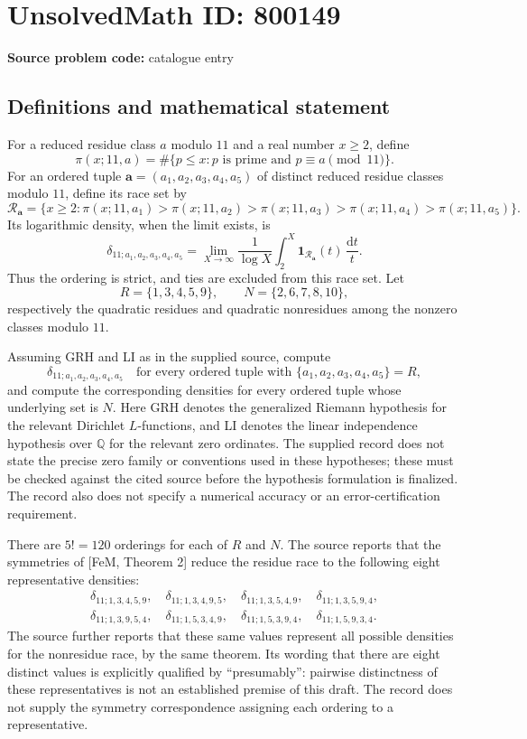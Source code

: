 \documentclass[11pt]{article}
\newcommand{\Q}{\mathbb{Q}}
\begin{document}
\section*{UnsolvedMath ID: 800149}
\textbf{Source problem code:} catalogue entry
\subsection{Definitions and mathematical statement}
For a reduced residue class \(a\) modulo \(11\) and a real number \(x\geq 2\), define
\[
\pi(x;11,a)=\#\{p\leq x:p\text{ is prime and }p\equiv a\pmod{11}\}.
\]
For an ordered tuple \(\boldsymbol a=(a_1,a_2,a_3,a_4,a_5)\) of distinct reduced residue classes modulo \(11\), define its race set by
\[
\mathcal R_{\boldsymbol a}=\{x\geq2:\pi(x;11,a_1)>\pi(x;11,a_2)>\pi(x;11,a_3)>\pi(x;11,a_4)>\pi(x;11,a_5)\}.
\]
Its logarithmic density, when the limit exists, is
\[
\delta_{11;a_1,a_2,a_3,a_4,a_5}
=\lim_{X\to\infty}\frac{1}{\log X}
\int_2^X\mathbf 1_{\mathcal R_{\boldsymbol a}}(t)\,\frac{\mathrm dt}{t}.
\]
Thus the ordering is strict, and ties are excluded from this race set. Let
\[
R=\{1,3,4,5,9\},\qquad N=\{2,6,7,8,10\},
\]
respectively the quadratic residues and quadratic nonresidues among the nonzero classes modulo \(11\).

Assuming GRH and LI as in the supplied source, compute
\[
\delta_{11;a_1,a_2,a_3,a_4,a_5}
\quad\text{for every ordered tuple with }\{a_1,a_2,a_3,a_4,a_5\}=R,
\]
and compute the corresponding densities for every ordered tuple whose underlying set is \(N\). Here GRH denotes the generalized Riemann hypothesis for the relevant Dirichlet \(L\)-functions, and LI denotes the linear independence hypothesis over \(\Q\) for the relevant zero ordinates. The supplied record does not state the precise zero family or conventions used in these hypotheses; these must be checked against the cited source before the hypothesis formulation is finalized. The record also does not specify a numerical accuracy or an error-certification requirement.

There are \(5!=120\) orderings for each of \(R\) and \(N\). The source reports that the symmetries of [FeM, Theorem 2] reduce the residue race to the following eight representative densities:
\[
\begin{gathered}
\delta_{11;1,3,4,5,9},\quad
\delta_{11;1,3,4,9,5},\quad
\delta_{11;1,3,5,4,9},\quad
\delta_{11;1,3,5,9,4},\\
\delta_{11;1,3,9,5,4},\quad
\delta_{11;1,5,3,4,9},\quad
\delta_{11;1,5,3,9,4},\quad
\delta_{11;1,5,9,3,4}.
\end{gathered}
\]
The source further reports that these same values represent all possible densities for the nonresidue race, by the same theorem. Its wording that there are eight distinct values is explicitly qualified by ``presumably'': pairwise distinctness of these representatives is not an established premise of this draft. The record does not supply the symmetry correspondence assigning each ordering to a representative.
\end{document}
